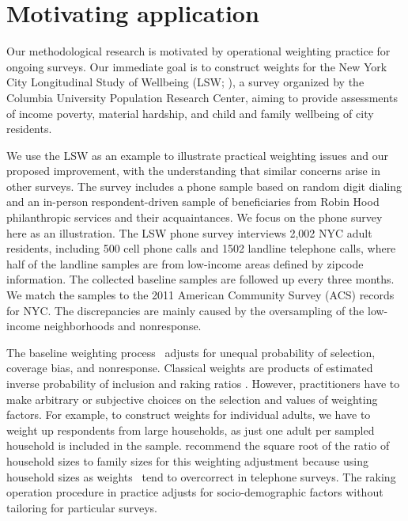 \documentclass[11pt]{article}
\numberwithin{figure}{section}
\numberwithin{table}{section}
\numberwithin{equation}{section}
\begin{document}
\section{Motivating application} \label{problem}
	
Our methodological research is motivated by operational weighting practice for
ongoing surveys. Our immediate goal is to construct weights for the New York
City Longitudinal Study of Wellbeing (LSW; \cite{RHweighting,RHreport}), a
survey organized by the Columbia University Population Research Center, aiming
to provide assessments of income poverty, material hardship, and child and
family wellbeing of city residents.

We use the LSW as an example to illustrate practical weighting issues and our
proposed improvement, with the understanding that similar concerns arise in
other surveys. The survey includes a phone sample based on random digit dialing
and an in-person respondent-driven sample of beneficiaries from Robin Hood
philanthropic services and their acquaintances. We focus on the phone survey
here as an illustration. The LSW phone survey interviews 2,002 NYC adult
residents, including 500 cell phone calls and 1502 landline telephone calls,
where half of the landline samples are from low-income areas defined by zipcode
information. The collected baseline samples are followed up every three months.
We match the samples to the 2011 American Community Survey (ACS) records for
NYC. The discrepancies are mainly caused by the oversampling of the low-income
neighborhoods and nonresponse. 

The baseline weighting process~\citep{RHweighting} adjusts for unequal
probability of selection, coverage bias, and nonresponse. Classical weights are
products of estimated inverse probability of inclusion and raking ratios
\citep{gr-rake93}. However, practitioners have to make arbitrary or subjective
choices on the selection and values of weighting factors. For example, to
construct weights for individual adults, we have to weight up respondents from
large households, as just one adult per sampled household is included in the
sample. \cite{gelman:little:98} recommend the square root of the ratio of
household sizes to family sizes for this weighting adjustment because using
household sizes as weights~\cite[for example,][]{acsweighting2014} tend to
overcorrect in telephone surveys. The raking operation procedure in practice
adjusts for socio-demographic factors without tailoring for particular surveys.
	
\end{document}
